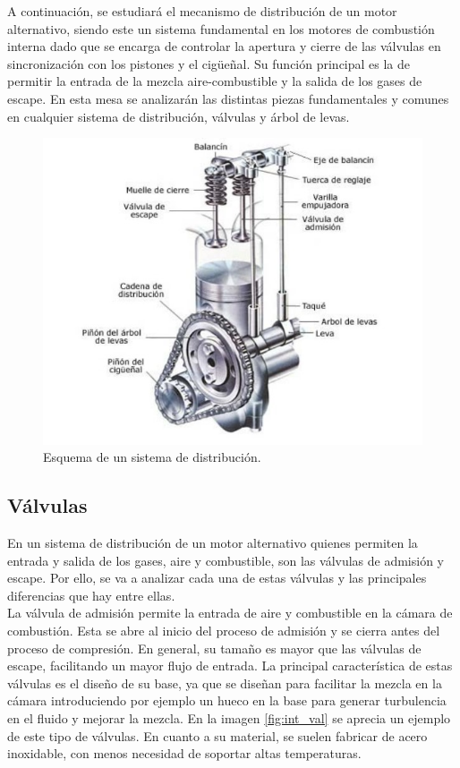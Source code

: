 A continuación, se estudiará el mecanismo de distribución de un motor alternativo, siendo este un sistema fundamental en los motores de combustión interna dado que se encarga de controlar la apertura y cierre de las válvulas en sincronización con los pistones y el cigüeñal. Su función principal es la de permitir la entrada de la mezcla aire-combustible y la salida de los gases de escape. En esta mesa se analizarán las distintas piezas fundamentales y comunes en cualquier sistema de distribución, válvulas y árbol de levas.
\begin{figure}[H]
	\centering
	\includegraphics[width=0.5\linewidth]{Figures/01/m2/distrib_schm.jpg}
	\caption{Esquema de un sistema de distribución.}
	\label{fig:dist_schm}
\end{figure}


\subsection{Válvulas} \label{ss:valves}

En un sistema de distribución de un motor alternativo quienes permiten la entrada y salida de los gases, aire y combustible, son las válvulas de admisión y escape. Por ello, se va a analizar cada una de estas válvulas y las principales diferencias que hay entre ellas.\\

La válvula de admisión permite la entrada de aire y combustible en la cámara de combustión. Esta se abre al inicio del proceso de admisión y se cierra antes del proceso de compresión. En general, su tamaño es mayor que las válvulas de escape, facilitando un mayor flujo de entrada. La principal característica de estas válvulas es el diseño de su base, ya que se diseñan para facilitar la mezcla en la cámara introduciendo por ejemplo un hueco en la base para generar turbulencia en el fluido y mejorar la mezcla. En la imagen \ref{fig:int_val} se aprecia un ejemplo de este tipo de válvulas. En cuanto a su material, se suelen fabricar de acero inoxidable, con menos necesidad de soportar altas temperaturas.\\

